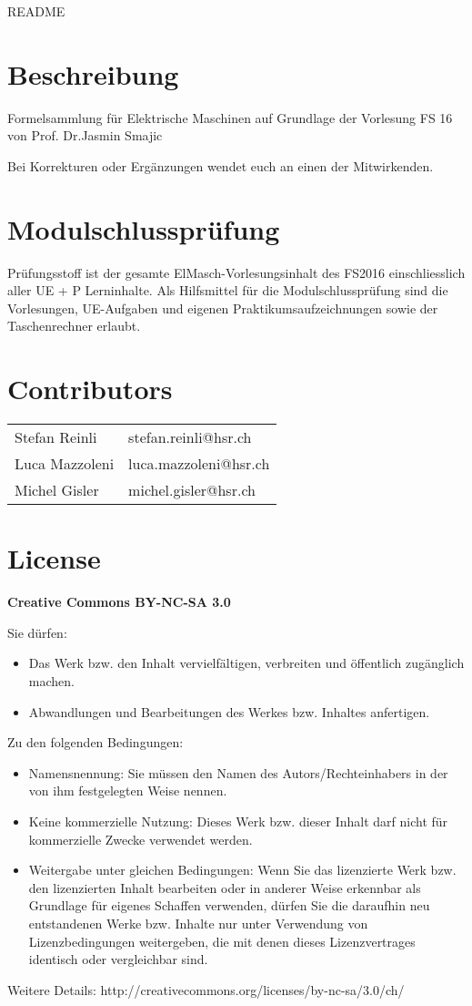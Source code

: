 \thispagestyle{empty}
{\huge README }
\section*{Beschreibung}
Formelsammlung für Elektrische Maschinen auf Grundlage der Vorlesung FS 16 von Prof. Dr.Jasmin Smajic \newline

Bei Korrekturen oder Ergänzungen wendet euch an einen der Mitwirkenden.

\section*{Modulschlussprüfung}
Prüfungsstoff ist der gesamte ElMasch-Vorlesungsinhalt des FS2016 einschliesslich aller UE + P Lerninhalte.\newline
Als Hilfsmittel für die Modulschlussprüfung sind die Vorlesungen,\newline
UE-Aufgaben und eigenen Praktikumsaufzeichnungen sowie der Taschenrechner erlaubt.


\section*{Contributors}
\begin{tabular}{ll}
    Stefan Reinli & stefan.reinli@hsr.ch \\ 
    Luca Mazzoleni& luca.mazzoleni@hsr.ch \\ 
    Michel Gisler& michel.gisler@hsr.ch \\ 
\end{tabular} 

\section*{License}
\textbf{Creative Commons BY-NC-SA 3.0}

Sie dürfen:
\begin{itemize}
    \item Das Werk bzw. den Inhalt vervielfältigen, verbreiten und öffentlich
    zugänglich machen.
    \item Abwandlungen und Bearbeitungen des Werkes bzw. Inhaltes anfertigen.
\end{itemize}
Zu den folgenden Bedingungen:
\begin{itemize}
    \item Namensnennung: Sie müssen den Namen des Autors/Rechteinhabers in der von ihm
    festgelegten Weise nennen.
    \item Keine kommerzielle Nutzung: Dieses Werk bzw. dieser Inhalt darf nicht für
    kommerzielle Zwecke verwendet werden.
    \item  Weitergabe unter gleichen Bedingungen: Wenn Sie das lizenzierte Werk bzw. den
    lizenzierten Inhalt bearbeiten oder in anderer Weise erkennbar als Grundlage
    für eigenes Schaffen verwenden, dürfen Sie die daraufhin neu entstandenen
    Werke bzw. Inhalte nur unter Verwendung von Lizenzbedingungen weitergeben,
    die mit denen dieses Lizenzvertrages identisch oder vergleichbar sind.
\end{itemize}
Weitere Details: http://creativecommons.org/licenses/by-nc-sa/3.0/ch/

\clearpage
{}%